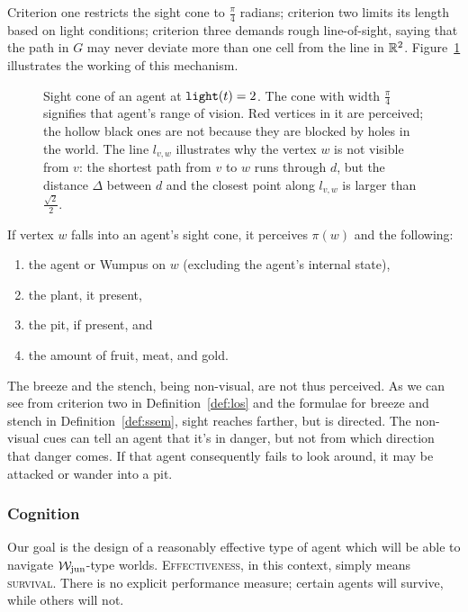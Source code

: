 Criterion one restricts the sight cone to $\frac{\pi}{4}$ radians; criterion two limits its length based on light conditions; criterion three demands rough line-of-sight, saying that the path in $G$ may never deviate more than one cell from the line in $\mathbb{R}^2$. Figure~\ref{fig:los} illustrates the working of this mechanism.
%
\begin{figure}
	\centering
	
	\caption{Sight cone of an agent at $\mathtt{light}(t) = 2$. The cone with width $\frac{\pi}{4}$ signifies that agent's range of vision. Red vertices in it are perceived; the hollow black ones are not because they are blocked by holes in the world. The line $l_{v,w}$ illustrates why the vertex $w$ is not visible from $v$: the shortest path from $v$ to $w$ runs through $d$, but the distance $\Delta$ between $d$ and the closest point along $l_{v,w}$ is larger than $\frac{\sqrt{2}}{2}$.}
	\label{fig:los}
\end{figure}
%
If vertex $w$ falls into an agent's sight cone, it perceives $\pi(w)$ and the following:

\begin{enumerate}
	\item the agent or Wumpus on $w$ (excluding the agent's internal state),
	\item the plant, it present,
	\item the pit, if present, and
	\item the amount of fruit, meat, and gold.
\end{enumerate}

The breeze and the stench, being non-visual, are not thus perceived. As we can see from criterion two in Definition~\ref{def:los} and the formulae for breeze and stench in Definition~\ref{def:ssem}, sight reaches farther, but is directed. The non-visual cues can tell an agent that it's in danger, but not from which direction that danger comes. If that agent consequently fails to look around, it may be attacked or wander into a pit.

\subsubsection{Cognition}

Our goal is the design of a reasonably effective type of agent which will be able to navigate $\mathcal{W}_{\mathrm{jun}}$-type worlds. \textsc{Effectiveness}, in this context, simply means \textsc{survival}. There is no explicit performance measure; certain agents will survive, while others will not.

